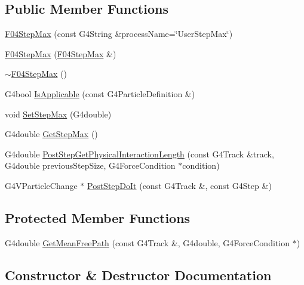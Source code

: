 \subsection*{Public Member Functions}
\begin{DoxyCompactItemize}
\item 
\hyperlink{classF04StepMax_a3a0e3aecc2103ec434993dd378651027}{F04\+Step\+Max} (const G4\+String \&process\+Name=\char`\"{}User\+Step\+Max\char`\"{})
\item 
\hyperlink{classF04StepMax_ad02ad9bcc82ed66f0485fccbffb469df}{F04\+Step\+Max} (\hyperlink{classF04StepMax}{F04\+Step\+Max} \&)
\item 
\hyperlink{classF04StepMax_adda938be7cf42dd3996d0c054cd77e87}{$\sim$\+F04\+Step\+Max} ()
\item 
G4bool \hyperlink{classF04StepMax_a16d37dfa479237ddc70abc022ea3c939}{Is\+Applicable} (const G4\+Particle\+Definition \&)
\item 
void \hyperlink{classF04StepMax_a405dd2e0d98119ea57657ff2e49e1ba1}{Set\+Step\+Max} (G4double)
\item 
G4double \hyperlink{classF04StepMax_a21dc6227ae46ff09e947142016081e45}{Get\+Step\+Max} ()
\item 
G4double \hyperlink{classF04StepMax_aa8cfb3146c37efa29e063d329b08986a}{Post\+Step\+Get\+Physical\+Interaction\+Length} (const G4\+Track \&track, G4double previous\+Step\+Size, G4\+Force\+Condition $\ast$condition)
\item 
G4\+V\+Particle\+Change $\ast$ \hyperlink{classF04StepMax_a6291ed1451a20a9e691c72d2f59b6fbd}{Post\+Step\+Do\+It} (const G4\+Track \&, const G4\+Step \&)
\end{DoxyCompactItemize}
\subsection*{Protected Member Functions}
\begin{DoxyCompactItemize}
\item 
G4double \hyperlink{classF04StepMax_ad2c054bbe47952e5d7af91e5a6f5cefe}{Get\+Mean\+Free\+Path} (const G4\+Track \&, G4double, G4\+Force\+Condition $\ast$)
\end{DoxyCompactItemize}


\subsection{Constructor \& Destructor Documentation}
